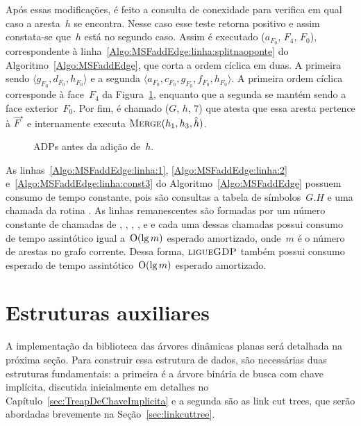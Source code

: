 Após essas modificações, é feito a consulta de conexidade para verifica em qual caso a aresta~$h$ se encontra.
Nesse caso esse teste retorna positivo e assim constata-se que~$h$ está no segundo caso.
Assim é executado \LCOSplit($a_{F_0}$, $F_4$, $F_0$), correspondente à linha~\ref{Algo:MSFaddEdge:linha:splitnaoponte} do Algoritmo~\ref{Algo:MSFaddEdge}, que corta a ordem cíclica em duas.
A primeira sendo $\langle g_{F_0}, d_{F_0}, h_{F_0}\rangle$ e a segunda $\langle a_{F_0}, c_{F_0}, g_{F_0}, f_{F_0}, h_{F_0}\rangle$.
A primeira ordem cíclica corresponde à face~$F_4$ da Figura~\ref{fig:MSF-adiciona-nao-ponte-2}, enquanto que a segunda se mantém sendo a face exterior~$F_0$.
Por fim, é chamado \MSFupdate($G$, $h$, $7$) que atesta que essa aresta pertence à $\hat F^\star$ e internamente executa $\text{\scshape Merge}(h_1, h_3, \hat h)$.

\begin{figure}
\scalebox{1}{

}
\caption{ADPs antes da adição de~$h$.}
\label{fig:MSF-adiciona-nao-ponte-2}
\end{figure}



As linhas~\ref{Algo:MSFaddEdge:linha:1}, \ref{Algo:MSFaddEdge:linha:2} e~\ref{Algo:MSFaddEdge:linha:const3} do Algoritmo~\ref{Algo:MSFaddEdge} possuem consumo de tempo constante, pois são consultas a tabela de símbolos~$G.H$ e uma chamada da rotina \LCOMakeOcto{}.
As linhas remanescentes são formadas por um número constante de chamadas de \LCOFindNode, \LCOCycle{}, \LCOMerge{}, \LCOSplit{}, \MSFupdate{} e \LCOConnected{} e cada uma dessas chamadas possui consumo de tempo assintótico igual a~$\mathrm{O}(\lg m)$ esperado amortizado, onde~$m$ é o número de arestas no grafo corrente.
Dessa forma, $\text{\scshape ligueGDP}$ também possui consumo esperado de tempo assintótico~$\mathrm{O}(\lg m)$ esperado amortizado.

\section{Estruturas auxiliares}

A implementação da biblioteca das árvores dinâmicas planas será detalhada na próxima seção.
Para construir essa estrutura de dados, são necessárias duas estruturas fundamentais: a primeira é a árvore binária de busca com chave implícita, discutida inicialmente em detalhes no Capítulo~\ref{sec:TreapDeChaveImplicita} e a segunda são as link cut trees, que serão abordadas brevemente na Seção~\ref{sec:linkcuttree}.

